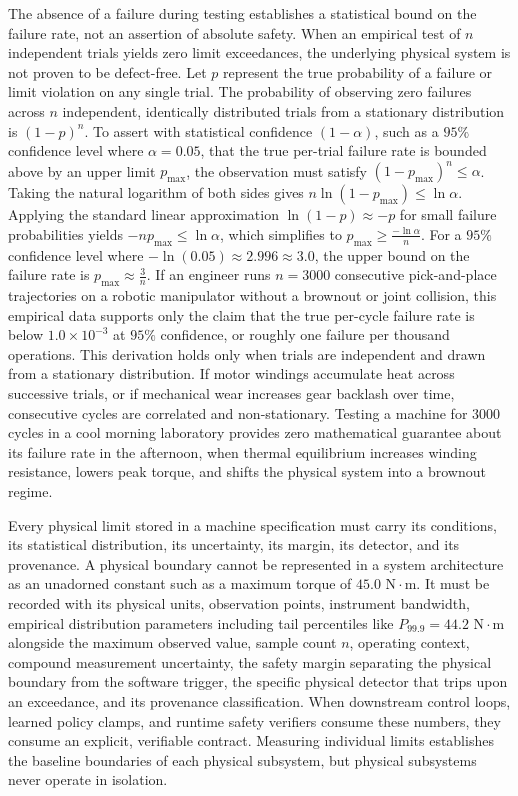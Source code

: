 \documentclass[
  letterpaper,
  DIV=11,
  numbers=noendperiod]{scrartcl}
\begin{document}
The absence of a failure during testing establishes a statistical bound
on the failure rate, not an assertion of absolute safety. When an
empirical test of \(n\) independent trials yields zero limit
exceedances, the underlying physical system is not proven to be
defect-free. Let \(p\) represent the true probability of a failure or
limit violation on any single trial. The probability of observing zero
failures across \(n\) independent, identically distributed trials from a
stationary distribution is \((1 - p)^n\). To assert with statistical
confidence \((1 - \alpha)\), such as a \(95\%\) confidence level where
\(\alpha = 0.05\), that the true per-trial failure rate is bounded above
by an upper limit \(p_{\text{max}}\), the observation must satisfy
\((1 - p_{\text{max}})^n \le \alpha\). Taking the natural logarithm of
both sides gives \(n \ln(1 - p_{\text{max}}) \le \ln \alpha\). Applying
the standard linear approximation \(\ln(1 - p) \approx -p\) for small
failure probabilities yields \(-n p_{\text{max}} \le \ln \alpha\), which
simplifies to \(p_{\text{max}} \ge \frac{-\ln \alpha}{n}\). For a
\(95\%\) confidence level where
\(-\ln(0.05) \approx 2.996 \approx 3.0\), the upper bound on the failure
rate is \(p_{\text{max}} \approx \frac{3}{n}\). If an engineer runs
\(n = 3000\) consecutive pick-and-place trajectories on a robotic
manipulator without a brownout or joint collision, this empirical data
supports only the claim that the true per-cycle failure rate is below
\(1.0 \times 10^{-3}\) at \(95\%\) confidence, or roughly one failure
per thousand operations. This derivation holds only when trials are
independent and drawn from a stationary distribution. If motor windings
accumulate heat across successive trials, or if mechanical wear
increases gear backlash over time, consecutive cycles are correlated and
non-stationary. Testing a machine for \(3000\) cycles in a cool morning
laboratory provides zero mathematical guarantee about its failure rate
in the afternoon, when thermal equilibrium increases winding resistance,
lowers peak torque, and shifts the physical system into a brownout
regime.

Every physical limit stored in a machine specification must carry its
conditions, its statistical distribution, its uncertainty, its margin,
its detector, and its provenance. A physical boundary cannot be
represented in a system architecture as an unadorned constant such as a
maximum torque of \(45.0\text{ N}\cdot\text{m}\). It must be recorded
with its physical units, observation points, instrument bandwidth,
empirical distribution parameters including tail percentiles like
\(P_{99.9} = 44.2\text{ N}\cdot\text{m}\) alongside the maximum observed
value, sample count \(n\), operating context, compound measurement
uncertainty, the safety margin separating the physical boundary from the
software trigger, the specific physical detector that trips upon an
exceedance, and its provenance classification. When downstream control
loops, learned policy clamps, and runtime safety verifiers consume these
numbers, they consume an explicit, verifiable contract. Measuring
individual limits establishes the baseline boundaries of each physical
subsystem, but physical subsystems never operate in isolation.
\end{document}
